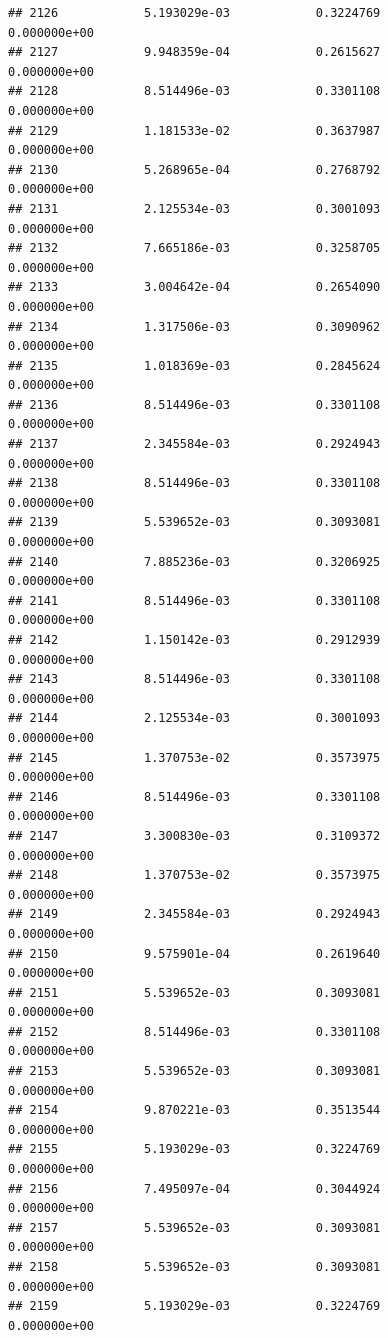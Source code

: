 \documentclass[
]{article}
\begin{document}
\begin{verbatim}
## 2126            5.193029e-03            0.3224769            0.000000e+00
## 2127            9.948359e-04            0.2615627            0.000000e+00
## 2128            8.514496e-03            0.3301108            0.000000e+00
## 2129            1.181533e-02            0.3637987            0.000000e+00
## 2130            5.268965e-04            0.2768792            0.000000e+00
## 2131            2.125534e-03            0.3001093            0.000000e+00
## 2132            7.665186e-03            0.3258705            0.000000e+00
## 2133            3.004642e-04            0.2654090            0.000000e+00
## 2134            1.317506e-03            0.3090962            0.000000e+00
## 2135            1.018369e-03            0.2845624            0.000000e+00
## 2136            8.514496e-03            0.3301108            0.000000e+00
## 2137            2.345584e-03            0.2924943            0.000000e+00
## 2138            8.514496e-03            0.3301108            0.000000e+00
## 2139            5.539652e-03            0.3093081            0.000000e+00
## 2140            7.885236e-03            0.3206925            0.000000e+00
## 2141            8.514496e-03            0.3301108            0.000000e+00
## 2142            1.150142e-03            0.2912939            0.000000e+00
## 2143            8.514496e-03            0.3301108            0.000000e+00
## 2144            2.125534e-03            0.3001093            0.000000e+00
## 2145            1.370753e-02            0.3573975            0.000000e+00
## 2146            8.514496e-03            0.3301108            0.000000e+00
## 2147            3.300830e-03            0.3109372            0.000000e+00
## 2148            1.370753e-02            0.3573975            0.000000e+00
## 2149            2.345584e-03            0.2924943            0.000000e+00
## 2150            9.575901e-04            0.2619640            0.000000e+00
## 2151            5.539652e-03            0.3093081            0.000000e+00
## 2152            8.514496e-03            0.3301108            0.000000e+00
## 2153            5.539652e-03            0.3093081            0.000000e+00
## 2154            9.870221e-03            0.3513544            0.000000e+00
## 2155            5.193029e-03            0.3224769            0.000000e+00
## 2156            7.495097e-04            0.3044924            0.000000e+00
## 2157            5.539652e-03            0.3093081            0.000000e+00
## 2158            5.539652e-03            0.3093081            0.000000e+00
## 2159            5.193029e-03            0.3224769            0.000000e+00

\end{verbatim}
\end{document}
